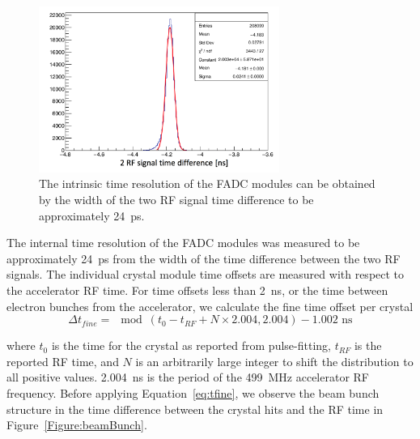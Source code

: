 \begin{figure}[htb]
  \centering
      \includegraphics[width=0.7\textwidth]{pics/performance/rfRes.png}
  \caption[FADC intrinsic time resolution]{The intrinsic time resolution of the FADC modules can be obtained by the width of the two RF signal time difference to be approximately 24~ps.}
  \label{Figure:intrTres}
\end{figure}

The internal time resolution of the FADC modules was measured to be approximately 24~ps from the width of the time difference between the two RF signals. The individual crystal module time offsets are measured with respect to the accelerator RF time. For time offsets less than 2~ns, or the time between electron bunches from the accelerator, we calculate the fine time offset per crystal \\

\begin{equation}
	\label{eq:tfine}
	\Delta t_{fine} = \mod(t_0 - t_{RF} + N\times 2.004, 2.004) - 1.002 \textrm{ ns}
\end{equation}

where $t_0$ is the time for the crystal as reported from pulse-fitting, $t_{RF}$ is the reported RF time, and $N$ is an arbitrarily large integer to shift the distribution to all positive values. 2.004~ns is the period of the 499~MHz accelerator RF frequency. Before applying Equation~\eqref{eq:tfine}, we observe the beam bunch structure in the time difference between the crystal hits and the RF time in Figure~\ref{Figure:beamBunch}. 

